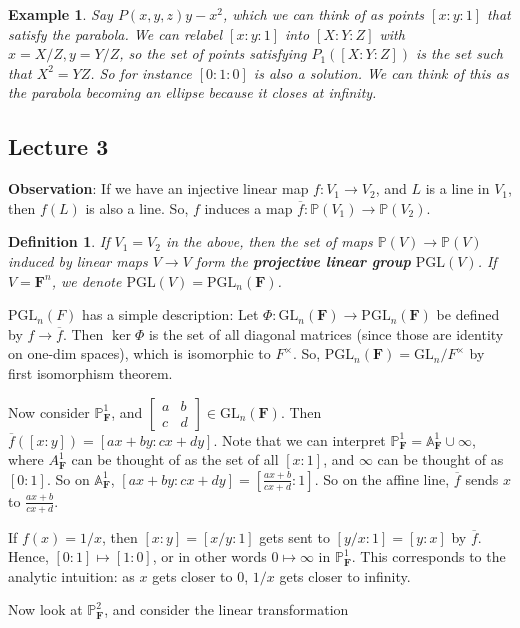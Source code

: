 \documentclass[12pt]{article}
\newcommand{\F}{\mathbf{F}}
\renewcommand{\P}{\mathbb{P}}
\newcommand{\GL}{\mathrm{GL}}
\newcommand{\A}{\mathbb{A}}
\newcommand{\PGL}{\mathrm{PGL}}
\newtheorem{definition}{Definition}
\newtheorem{example}[]{Example}
\begin{document}
    \begin{example}
        Say $P(x, y, z) y - x^2$, which we can think of as points $[x:y:1]$ that satisfy the parabola. We can relabel $[x:y:1]$ into $[X:Y:Z]$ with $x = X/Z, y = Y/Z$, so the set of points satisfying $P_1([X:Y:Z])$ is the set such that $X^2 = YZ$. So for instance $[0:1:0]$ is also a solution. We can think of this as the parabola becoming an ellipse because it closes at infinity. 
    \end{example}

    \subsection{Lecture 3}
    \textbf{Observation}: If we have an injective linear map $f: V_1 \to V_2$, and $L$ is a line in $V_1$, then $f(L)$ is also a line. So, $f$ induces a map $\overline{f}: \P(V_1) \to \P(V_2)$.
    \begin{definition}
        If $V_1 = V_2$ in the above, then the set of maps $\P(V) \to \P(V)$ induced by linear maps $V \to V$ form the \textbf{projective linear group} $\PGL(V)$. If $V = \F^n$, we denote $\PGL(V) = \PGL_n(\F)$. 
    \end{definition}
    $\PGL_n(F)$ has a simple description: Let $\Phi: \GL_n(\F) \to \PGL_n(\F)$ be defined by $f \to \overline{f}$. Then $\ker \Phi$ is the set of all diagonal matrices (since those are identity on one-dim spaces), which is isomorphic to $F^\times$. So, $\PGL_n(\F) = \GL_n/F^\times$ by first isomorphism theorem. \par
    Now consider $\P_\F^1$, and $\begin{bmatrix}
        a & b \\ c & d
    \end{bmatrix} \in \GL_n(\F)$. Then $\overline{f}([x: y]) = [ax+by: cx+dy]$. Note that we can interpret $\P_\F^1 = \A_\F^1 \cup \infty$, where $A_\F^1$ can be thought of as the set of all $[x:1]$, and $\infty$ can be thought of as $[0:1]$. So on $\A_\F^1$, $[ax+by: cx+dy] = [\frac{ax+b}{cx+d}:1]$. So on the affine line, $\overline{f}$ sends $x$ to $\frac{ax+b}{cx+d}$. \par 
    If $f(x) = 1/x$, then $[x:y] = [x/y:1]$ gets sent to $[y/x:1] = [y:x]$ by $\overline{f}$. Hence, $[0:1] \mapsto [1:0]$, or in other words $0 \mapsto \infty$ in $\P_\F^1$. This corresponds to the analytic intuition: as $x$ gets closer to $0$, $1/x$ gets closer to infinity. \par 
    Now look at $\P_\F^2$, and consider the linear transformation 
\end{document}

